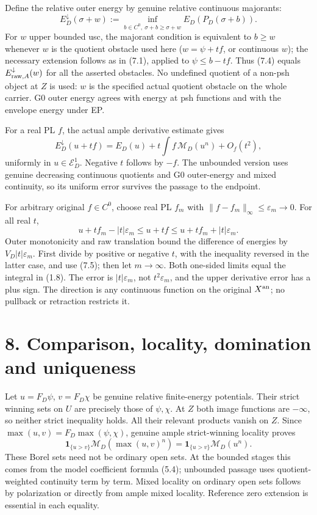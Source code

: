 \documentclass[
  10pt,
]{article}
\begin{document}
Define the relative outer energy by genuine relative continuous
majorants: \[
 E_D^\downarrow(\sigma+w)
   :=\inf_{b\in C^0,\ \sigma+b\geq\sigma+w}E_D(P_D(\sigma+b)). \tag{7.4}
\] For \(w\) upper bounded usc, the majorant condition is equivalent to
\(b\geq w\) whenever \(w\) is the quotient obstacle used here
(\(w=\psi+tf\), or continuous \(w\)); the necessary extension follows as
in (7.1), applied to \(\psi\leq b-tf\). Thus (7.4) equals
\(E_{{\rm raw},A}^{\downarrow}(w)\) for all the asserted obstacles. No
undefined quotient of a non-psh object at \(Z\) is used: \(w\) is the
specified actual quotient obstacle on the whole carrier. G0 outer energy
agrees with energy at psh functions and with the envelope energy under
EP.

For a real PL \(f\), the actual ample derivative estimate gives \[
 E_D^\downarrow(u+tf)=E_D(u)+t\int f\,\mathcal M_D(u^n)+O_f(t^2), \tag{7.5}
\] uniformly in \(u\in\mathcal E_D^1\). Negative \(t\) follows by
\(-f\). The unbounded version uses genuine decreasing continuous
quotients and G0 outer-energy and mixed continuity, so its uniform error
survives the passage to the endpoint.

For arbitrary original \(f\in C^0\), choose real PL \(f_m\) with
\(\|f-f_m\|_\infty\leq\varepsilon_m\to0\). For all real \(t\), \[
 u+tf_m-|t|\varepsilon_m\leq u+tf\leq u+tf_m+|t|\varepsilon_m.
\] Outer monotonicity and raw translation bound the difference of
energies by \(V_D|t|\varepsilon_m\). First divide by positive or
negative \(t\), with the inequality reversed in the latter case, and use
(7.5); then let \(m\to\infty\). Both one-sided limits equal the integral
in (1.8). The error is \(|t|\varepsilon_m\), not \(t^2\varepsilon_m\),
and the upper derivative error has a plus sign. The direction is any
continuous function on the original \(X^{\rm an}\); no pullback or
retraction restricts it.

\section{8. Comparison, locality, domination and
uniqueness}\label{comparison-locality-domination-and-uniqueness}

Let \(u=F_D\psi\), \(v=F_D\chi\) be genuine relative finite-energy
potentials. Their strict winning sets on \(U\) are precisely those of
\(\psi,\chi\). At \(Z\) both image functions are \(-\infty\), so neither
strict inequality holds. All their relevant products vanish on \(Z\).
Since \(\max(u,v)=F_D\max(\psi,\chi)\), genuine ample strict-winning
locality proves \[
 \mathbf1_{\{u>v\}}\mathcal M_D(\max(u,v)^n)
                    =\mathbf1_{\{u>v\}}\mathcal M_D(u^n).
\] These Borel sets need not be ordinary open sets. At the bounded
stages this comes from the model coefficient formula (5.4); unbounded
passage uses quotient-weighted continuity term by term. Mixed locality
on ordinary open sets follows by polarization or directly from ample
mixed locality. Reference zero extension is essential in each equality.
\end{document}
